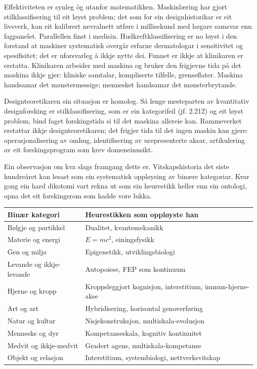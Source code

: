 \begin{widebody}
{Effektiviteten er synleg òg utanfor matematikken. Maskinlæring har gjort stilklassifisering til eit løyst problem; det som for ein designhistorikar er eit livsverk, kan eit kalibrert nevralnett utføre i millisekund med høgare samsvar enn fagpanelet. Parallellen finst i medisin. Hudkreftklassifisering er no løyst i den forstand at maskiner systematisk overgår erfarne dermatologar i sensitivitet og spesifisitet; det er uforsvarleg å ikkje nytte dei. Funnet er ikkje at klinikaren er erstatta. Klinikaren arbeider med maskina og bruker den frigjevne tida på det maskina ikkje gjer: kliniske samtalar, kompliserte tilfelle, grenseflater. Maskina handsamar det mønstermessige; mennesket handsamar det mønsterbrytande.

Designteoretikaren sin situasjon er homolog. Så lenge mesteparten av kvantitativ designforsking er stilklassifisering, som er ein kategorifeil (jf. 2.212) og eit løyst problem, bind faget forskingstida si til det maskina allereie kan. Rammeverket erstattar ikkje designteoretikaren; det frigjer tida til det ingen maskin kan gjere: operasjonalisering av omhug, identifisering av urepresenterte aksar, artikulering av eit forskingsprogram som krev domeneinnsikt.

Ein observasjon om kva slags framgang dette er. Vitskapshistoria det siste hundreåret kan lesast som ein systematisk oppløysing av binære kategoriar. Kvar gong ein hard dikotomi vart rekna ut som ein heurestikk heller enn ein ontologi, opna det eit forskingsrom som hadde vore lukka.

\begin{center}
\footnotesize
\renewcommand{\arraystretch}{1.15}
\begin{tabular}{@{}p{42mm}p{58mm}@{}}
\toprule
\textbf{Binær kategori} & \textbf{Heurestikken som oppløyste han} \\
\midrule
Bølgje og partikkel & Dualitet, kvantemekanikk \\
Materie og energi & $E=mc^2$, einingsfysikk \\
Gen og miljø & Epigenetikk, utviklingsbiologi \\
Levande og ikkje-levande & Autopoiese, FEP som kontinuum \\
Hjerne og kropp & Kroppsleggjort kognisjon, interstitium, immun-hjerne-akse \\
Art og art & Hybridisering, horisontal genoverføring \\
Natur og kultur & Nisjekonstruksjon, multiskala-evolusjon \\
Menneske og dyr & Kompetanseskala, kognitiv kontinuitet \\
Medvit og ikkje-medvit & Gradert agens, multiskala-kompetanse \\
Objekt og relasjon & Interstitium, systembiologi, nettverksvitskap \\
\bottomrule
\end{tabular}
\end{center}

}
\end{widebody}
